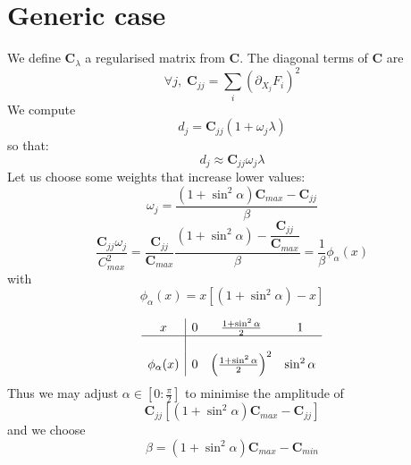 \documentclass[aps,12pt]{revtex4}
\begin{document}
\section{Generic case}
We define $\bm{C}_\lambda$ a regularised matrix from $\bm{C}$.
The diagonal terms of $\bm{C}$ are
\begin{equation}
	\forall j, \; \bm{C}_{jj} = \sum_i \left(\partial_{X_j} F_i\right)^2
\end{equation}
We compute
\begin{equation}
	d_j = \bm{C}_{jj} (1+\omega_j \lambda)
\end{equation}
so that:
\begin{equation}
	d_j \approx \bm{C}_{jj} \omega_j \lambda
\end{equation}
Let us choose some weights that increase lower values:
\begin{equation}
	\omega_j = \dfrac{ (1+\sin^2\alpha) \bm{C}_{max}- \bm{C}_{jj}}{\beta}
\end{equation}
\begin{equation}
	\dfrac{\bm{C}_{jj}\omega_j}{C_{max}^2} 
	= \dfrac{\bm{C}_{jj}}{\bm{C}_{max}}\dfrac{ (1+\sin^2\alpha) - \dfrac{\bm{C}_{jj}}{\bm{C}_{max}} }{\beta}
	= \dfrac{1}{\beta} \phi_\alpha(x)
\end{equation}
with
\begin{equation}
	\phi_\alpha(x) = x \left[  (1+\sin^2\alpha) - x \right]
\end{equation}

\begin{equation}
\begin{array}{c|ccc}
x & 0 & \frac{1+\sin^2\alpha}{2} & 1\\
\hline
\\
\phi_\alpha(x) & 0 &  \left(\frac{1+\sin^2\alpha}{2}\right)^2 & \sin^2\alpha\\
\end{array}
\end{equation}
Thus we may adjust $\alpha\in[0:\frac{\pi}{2}]$ to minimise the amplitude of 
\begin{equation}
\bm{C}_{jj}\left[(1+\sin^2\alpha) \bm{C}_{max}- \bm{C}_{jj}\right]
\end{equation}
 and we choose
 \begin{equation}
  \beta = (1+\sin^2\alpha) \bm{C}_{max}-\bm{C}_{min}
 \end{equation}
 
\end{document}
